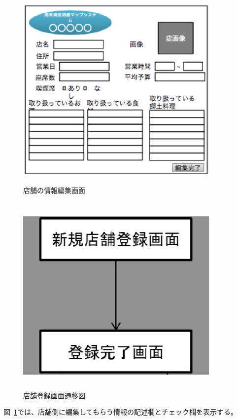 \begin {figure}[!htbp]
    \begin{center}
    \includegraphics [height=10cm, width=10cm]{28.eps}
    \caption {店舗の情報編集画面}
    \label {fig:28}
    \end{center}
\end {figure}



\begin {figure}[!htbp]
    \begin{center}
    \includegraphics [height=10cm, width=10cm]{29.eps}
    \caption {店舗登録画面遷移図}
    \label {fig:29}
    \end{center}
\end {figure}
\clearpage
図~\ref{fig:28}では、店舗側に編集してもらう情報の記述欄とチェック欄を表示する。




